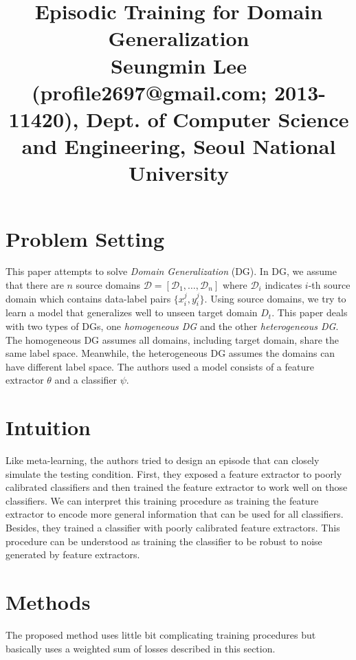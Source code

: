 \documentclass[10pt,twocolumn,letterpaper]{article}
\newcommand{\D}{\mathcal{D}}
\begin{document}
\title{Episodic Training for Domain Generalization
	 \\ {\rm {\normalsize Seungmin Lee (profile2697@gmail.com; 2013-11420), Dept. of Computer Science and Engineering, Seoul National University}}} 

\maketitle
\thispagestyle{empty}


\section{Problem Setting}
This paper attempts to solve \textit{Domain Generalization} (DG). In DG, we assume that there are $n$ source domains $\D = [\D_1,\dots, \D_n]$ where $\D_i$ indicates $i$-th source domain which contains data-label pairs $\{x_i^j, y_i^j\}$. Using source domains, we try to learn a model that generalizes well to unseen target domain $D_t$. This paper deals with two types of DGs, one \textit{homogeneous DG} and the other \textit{heterogeneous DG}. The homogeneous DG assumes all domains, including target domain, share the same label space. Meanwhile, the heterogeneous DG assumes the domains can have different label space.
The authors used a model consists of a feature extractor $\theta$ and a classifier $\psi$. 

\section{Intuition}
Like meta-learning, the authors tried to design an episode that can closely simulate the testing condition. First, they exposed a feature extractor to poorly calibrated classifiers and then trained the feature extractor to work well on those classifiers. We can interpret this training procedure as training the feature extractor to encode more general information that can be used for all classifiers. Besides, they trained a classifier with poorly calibrated feature extractors. This procedure can be understood as training the classifier to be robust to noise generated by feature extractors.

\section{Methods}
The proposed method uses little bit complicating training procedures but basically uses a weighted sum of losses described in this section.
\end{document}
